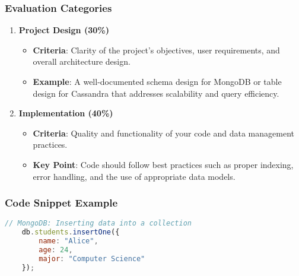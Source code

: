\documentclass[aspectratio=169]{beamer}
\begin{document}
\begin{frame}
    \frametitle{Evaluation Categories}
    \begin{enumerate}
        \item \textbf{Project Design (30\%)}
            \begin{itemize}
                \item \textbf{Criteria}: Clarity of the project's objectives, user requirements, and overall architecture design.
                \item \textbf{Example}: A well-documented schema design for MongoDB or table design for Cassandra that addresses scalability and query efficiency.
            \end{itemize}
        
        \item \textbf{Implementation (40\%)}
            \begin{itemize}
                \item \textbf{Criteria}: Quality and functionality of your code and data management practices.
                \item \textbf{Key Point}: Code should follow best practices such as proper indexing, error handling, and the use of appropriate data models.
            \end{itemize}
    \end{enumerate}
\end{frame}

\begin{frame}[fragile]
    \frametitle{Code Snippet Example}
    \begin{lstlisting}[language=JavaScript]
    // MongoDB: Inserting data into a collection
    db.students.insertOne({
        name: "Alice",
        age: 24,
        major: "Computer Science"
    });
    \end{lstlisting}
\end{frame}
\end{document}
